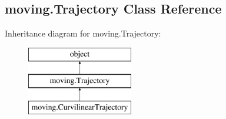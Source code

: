 \hypertarget{classmoving_1_1Trajectory}{\subsection{moving.\-Trajectory Class Reference}
\label{classmoving_1_1Trajectory}
}
Inheritance diagram for moving.\-Trajectory\-:\begin{figure}[H]
\begin{center}
\leavevmode
\includegraphics[height=3.000000cm]{classmoving_1_1Trajectory}
\end{center}
\end{figure}
